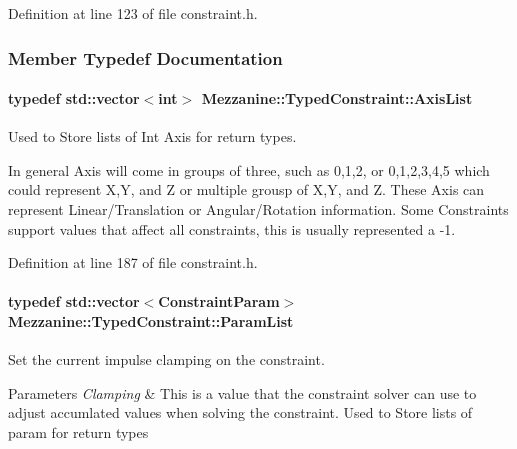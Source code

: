 Definition at line 123 of file constraint.h.



\subsubsection{Member Typedef Documentation}
\hypertarget{classMezzanine_1_1TypedConstraint_ac6b8e0839cd686f73d0c9e9ad5db47a4}{
\paragraph[{AxisList}]{\setlength{\rightskip}{0pt plus 5cm}typedef std::vector$<$int$>$ {\bf Mezzanine::TypedConstraint::AxisList}}\hfill}
\label{classMezzanine_1_1TypedConstraint_ac6b8e0839cd686f73d0c9e9ad5db47a4}


Used to Store lists of Int Axis for return types. 

In general Axis will come in groups of three, such as 0,1,2, or 0,1,2,3,4,5 which could represent X,Y, and Z or multiple grousp of X,Y, and Z. These Axis can represent Linear/Translation or Angular/Rotation information. Some Constraints support values that affect all constraints, this is usually represented a -\/1. 

Definition at line 187 of file constraint.h.

\hypertarget{classMezzanine_1_1TypedConstraint_abd499db29c9e9755e9bb547d29eaa49a}{
\paragraph[{ParamList}]{\setlength{\rightskip}{0pt plus 5cm}typedef std::vector$<${\bf ConstraintParam}$>$ {\bf Mezzanine::TypedConstraint::ParamList}}\hfill}
\label{classMezzanine_1_1TypedConstraint_abd499db29c9e9755e9bb547d29eaa49a}


Set the current impulse clamping on the constraint. 


\begin{DoxyParams}{Parameters}
{\em Clamping} & This is a value that the constraint solver can use to adjust accumlated values when solving the constraint. Used to Store lists of param for return types \\
\hline
\end{DoxyParams}


